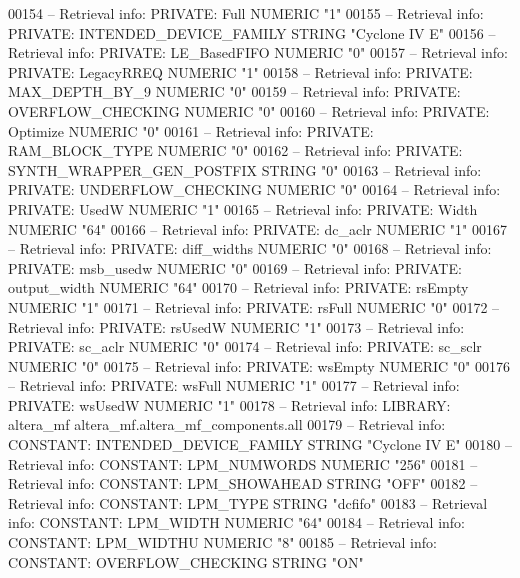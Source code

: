 \begin{DoxyCode}
{00154 \textcolor{keyword}{-- Retrieval info: PRIVATE: Full NUMERIC "1"}
00155 \textcolor{keyword}{-- Retrieval info: PRIVATE: INTENDED\_DEVICE\_FAMILY STRING "Cyclone IV E"}
00156 \textcolor{keyword}{-- Retrieval info: PRIVATE: LE\_BasedFIFO NUMERIC "0"}
00157 \textcolor{keyword}{-- Retrieval info: PRIVATE: LegacyRREQ NUMERIC "1"}
00158 \textcolor{keyword}{-- Retrieval info: PRIVATE: MAX\_DEPTH\_BY\_9 NUMERIC "0"}
00159 \textcolor{keyword}{-- Retrieval info: PRIVATE: OVERFLOW\_CHECKING NUMERIC "0"}
00160 \textcolor{keyword}{-- Retrieval info: PRIVATE: Optimize NUMERIC "0"}
00161 \textcolor{keyword}{-- Retrieval info: PRIVATE: RAM\_BLOCK\_TYPE NUMERIC "0"}
00162 \textcolor{keyword}{-- Retrieval info: PRIVATE: SYNTH\_WRAPPER\_GEN\_POSTFIX STRING "0"}
00163 \textcolor{keyword}{-- Retrieval info: PRIVATE: UNDERFLOW\_CHECKING NUMERIC "0"}
00164 \textcolor{keyword}{-- Retrieval info: PRIVATE: UsedW NUMERIC "1"}
00165 \textcolor{keyword}{-- Retrieval info: PRIVATE: Width NUMERIC "64"}
00166 \textcolor{keyword}{-- Retrieval info: PRIVATE: dc\_aclr NUMERIC "1"}
00167 \textcolor{keyword}{-- Retrieval info: PRIVATE: diff\_widths NUMERIC "0"}
00168 \textcolor{keyword}{-- Retrieval info: PRIVATE: msb\_usedw NUMERIC "0"}
00169 \textcolor{keyword}{-- Retrieval info: PRIVATE: output\_width NUMERIC "64"}
00170 \textcolor{keyword}{-- Retrieval info: PRIVATE: rsEmpty NUMERIC "1"}
00171 \textcolor{keyword}{-- Retrieval info: PRIVATE: rsFull NUMERIC "0"}
00172 \textcolor{keyword}{-- Retrieval info: PRIVATE: rsUsedW NUMERIC "1"}
00173 \textcolor{keyword}{-- Retrieval info: PRIVATE: sc\_aclr NUMERIC "0"}
00174 \textcolor{keyword}{-- Retrieval info: PRIVATE: sc\_sclr NUMERIC "0"}
00175 \textcolor{keyword}{-- Retrieval info: PRIVATE: wsEmpty NUMERIC "0"}
00176 \textcolor{keyword}{-- Retrieval info: PRIVATE: wsFull NUMERIC "1"}
00177 \textcolor{keyword}{-- Retrieval info: PRIVATE: wsUsedW NUMERIC "1"}
00178 \textcolor{keyword}{-- Retrieval info: LIBRARY: altera\_mf altera\_mf.altera\_mf\_components.all}
00179 \textcolor{keyword}{-- Retrieval info: CONSTANT: INTENDED\_DEVICE\_FAMILY STRING "Cyclone IV E"}
00180 \textcolor{keyword}{-- Retrieval info: CONSTANT: LPM\_NUMWORDS NUMERIC "256"}
00181 \textcolor{keyword}{-- Retrieval info: CONSTANT: LPM\_SHOWAHEAD STRING "OFF"}
00182 \textcolor{keyword}{-- Retrieval info: CONSTANT: LPM\_TYPE STRING "dcfifo"}
00183 \textcolor{keyword}{-- Retrieval info: CONSTANT: LPM\_WIDTH NUMERIC "64"}
00184 \textcolor{keyword}{-- Retrieval info: CONSTANT: LPM\_WIDTHU NUMERIC "8"}
00185 \textcolor{keyword}{-- Retrieval info: CONSTANT: OVERFLOW\_CHECKING STRING "ON"}
}
\end{DoxyCode}
